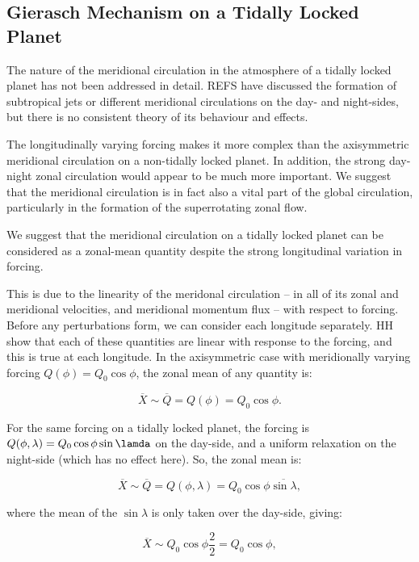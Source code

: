 \subsection{Gierasch Mechanism on a Tidally Locked Planet}


The nature of the meridional circulation in the atmosphere of a tidally locked planet has not been addressed in detail. REFS have discussed the formation of subtropical jets or different meridional circulations on the day- and night-sides, but there is no consistent theory of its behaviour and effects.

The longitudinally varying forcing makes it more complex than the axisymmetric meridional circulation on a non-tidally locked planet. In addition, the strong day-night zonal circulation would appear to be much more important. We suggest that the meridional circulation is in fact also a vital part of the global circulation, particularly in the formation of the superrotating zonal flow.

We suggest that the meridional circulation on a tidally locked planet can be considered as a zonal-mean quantity despite the strong longitudinal variation in forcing.

This is due to the linearity of the meridonal circulation -- in all of its zonal and meridional velocities, and meridional momentum flux -- with respect to forcing. Before any perturbations form, we can consider each longitude separately. HH show that each of these quantities are linear with response to the forcing, and this is true at each longitude. In the axisymmetric case with meridionally varying forcing $Q(\phi) = Q_{0}\cos{\phi}$, the zonal mean of any quantity is:

\begin{equation}
  \overline{X} \sim \overline{Q} = Q(\phi)=Q_{0}\cos{\phi}.
\end{equation}

For the same forcing on a tidally locked planet, the forcing is $ Q(\phi,\lambda)=Q_{0}\cos{\phi}\sin{\lamda}$ on the day-side, and a uniform relaxation on the night-side (which has no effect here). So, the zonal mean is:

\begin{equation}
  \overline{X} \sim \overline{Q} = Q(\phi,\lambda)=Q_{0}\cos{\phi}\overline{\sin\lambda},
\end{equation}

where the mean of the $\sin \lambda$ is only taken over the day-side, giving:

\begin{equation}
  \overline{X} \sim Q_{0}\cos{\phi}\frac{2}{2} = Q_{0}\cos{\phi},
\end{equation}

